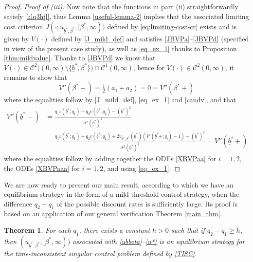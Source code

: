 \documentclass[11pt]{article} %
\newtheorem{theorem}{Theorem}[section]
\def\ub{\underline{b}}
\numberwithin{komcounter}{section}
\begin{document}
\begin{proof}
\vspace{1mm}
{\it Proof of (iii).}
Now note that the functions in part (ii) straightforwardly satisfy \eqref{hlq3hjl}, thus Lemma \ref{useful-lemma-2} implies that the associated limiting cost criterion $J(\cdot;u_{\ub^*,\beta^*},[\beta^*,\infty))$ defined by \eqref{eq:limiting-cost-cr} exists and is given by $V(\cdot)$ defined by \eqref{J_mild_def} and satisfies \eqref{JBVPa}--\eqref{JBVPd} (specified in view of the present case study), as well as \eqref{eq_ex_1} thanks to Proposition \ref{thm:mildvalue}. 
Thanks to \eqref{JBVPd} we know that $V(\cdot)\in \mathcal{C}^2\big( (0,\infty) \setminus \{\ub^*,\beta^*\} \big) \cap \mathcal{C}^1(0,\infty)$, hence for $V(\cdot)\in\mathcal{C}^2(0,\infty)$, it remains to show that 
$$
V''(\beta^*-) = \tfrac12 (a_1 + a_2) = 0 = V''(\beta^*+)
$$
where the equalities follow by \eqref{J_mild_def}, \eqref{eq_ex_1} and \eqref{candv}, and that
\begin{align*}
V''(\ub^*-) 
&= \frac{q_1 v(\ub^*;q_1) + q_2 v(\ub^*;q_2) - (\ub^*)^2}{\sigma^2 (\ub^*)^2} \\
&= \frac{q_1 v(\ub^*;q_1) + q_2 v(\ub^*;q_2) + 2 u_{\ub^*,\beta^*}(\ub^*) (V'(\ub^*+;q_i) - 1) - (\ub^*)^2}{\sigma^2 (\ub^*)^2}
= V''(\ub^*+)
\end{align*}
where the equalities follow by adding together the ODEs \eqref{XBVPaa} for $i=1,2$, the ODEs \eqref{XBVPaaa} for $i=1,2$, and using \eqref{eq_ex_1}. 
\end{proof}


We are now ready to present our main result, according to which we have an equilibrium strategy in the form of a mild threshold control strategy, when the difference $q_2-q_1$ of the possible discount rates is sufficiently large. 
Its proof is based on an application of our general verification Theorem \ref{main_thm}.

\begin{theorem} \label{ex_mix_theorem}  
For each $q_1$, there exists a constant $h>0$ such that if $q_2-q_1\geq h$, then $(u_{\ub^*,\beta^*},[\beta^*,\infty))$ associated with \eqref{ubbeta}--\eqref{u*} is an equilibrium strategy for the time-inconsistent singular control problem defined by \eqref{TISC}. 
\end{theorem}
\end{document}

